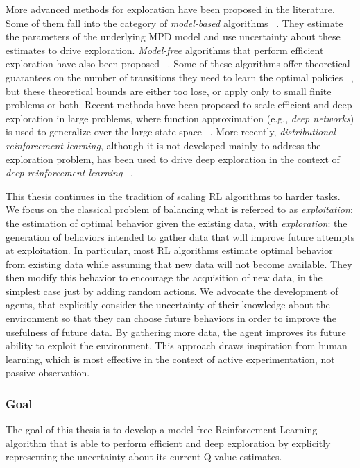 More advanced methods for exploration have been proposed in the literature. Some of them fall into the category of \emph{model-based} algorithms ~\cite{Kearns:2002:NRL:599616.599699,Brafman:2003:RGP:944919.944928,NIPS2006_3052}. They estimate the parameters of the underlying MPD model and use uncertainty about these estimates to drive exploration. \emph{Model-free} algorithms that perform efficient exploration have also been proposed ~\cite{Strehl:2006:PMR:1143844.1143955,Dearden98bayesianq-learning}. Some of these algorithms offer theoretical guarantees on the number of transitions they need to learn the optimal policies ~\cite{Kearns:2002:NRL:599616.599699,Brafman:2003:RGP:944919.944928,NIPS2006_3052,Strehl:2006:PMR:1143844.1143955}, but these theoretical bounds are either too lose, or apply only to small finite problems or both. Recent methods have been proposed to scale efficient and deep exploration in large problems, where function approximation (e.g., \emph{deep networks}) is used to generalize over the large state space ~\cite{DBLP:journals/corr/OsbandBPR16}. More recently, \emph{distributional reinforcement learning}, although it is not developed mainly to address the exploration problem, has been used to drive deep exploration in the context of \emph{deep reinforcement learning} ~\cite{DBLP:journals/corr/BellemareDM17,DBLP:journals/corr/abs-1710-10044}.
\par
This thesis continues in the tradition of scaling RL algorithms to harder tasks. We focus on the classical problem of balancing what is referred to as \emph{exploitation}: the estimation of optimal behavior given the existing data, with \emph{exploration}: the generation of behaviors intended to gather data that will improve future attempts at exploitation. In particular, most RL algorithms estimate optimal behavior from existing data while assuming that new data will not become available. They then modify this behavior to encourage the acquisition of new data, in the simplest case just by adding random actions. We advocate the development of agents, that explicitly  consider the uncertainty of their knowledge about the environment so that they can choose future behaviors in order to improve the usefulness of future data. By gathering more data, the agent improves its future ability to exploit the environment. This approach draws inspiration from human learning, which is most effective in the context of active experimentation, not passive observation. 
\subsubsection{Goal}
The goal of this thesis is to develop a model-free Reinforcement Learning algorithm that is able to perform efficient and deep exploration by explicitly representing the uncertainty  about its current Q-value estimates. 
